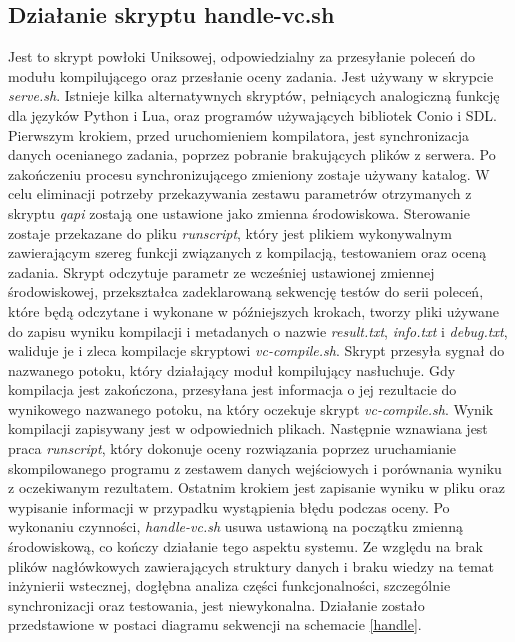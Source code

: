 \subsection{Działanie skryptu handle-vc.sh}
Jest to skrypt powłoki Uniksowej, odpowiedzialny za przesyłanie poleceń do modułu kompilującego oraz przesłanie oceny zadania. Jest używany w skrypcie \textit{serve.sh}. Istnieje kilka alternatywnych skryptów, pełniących analogiczną funkcję dla języków Python i Lua, oraz programów używających bibliotek Conio i SDL. Pierwszym krokiem, przed uruchomieniem kompilatora, jest synchronizacja danych ocenianego zadania, poprzez pobranie brakujących plików z serwera. Po zakończeniu procesu synchronizującego zmieniony zostaje używany katalog. W celu eliminacji potrzeby przekazywania zestawu parametrów otrzymanych z skryptu \textit{qapi} zostają one ustawione jako zmienna środowiskowa. Sterowanie zostaje przekazane do pliku \textit{runscript}, który jest plikiem wykonywalnym zawierającym szereg funkcji związanych z kompilacją, testowaniem oraz oceną zadania. Skrypt odczytuje parametr ze wcześniej ustawionej zmiennej środowiskowej, przekształca zadeklarowaną sekwencję testów do serii poleceń, które będą odczytane i wykonane w późniejszych krokach, tworzy pliki używane do zapisu wyniku kompilacji i metadanych o nazwie \textit{result.txt}, \textit{info.txt} i \textit{debug.txt}, waliduje je i zleca kompilacje skryptowi \textit{vc-compile.sh}. Skrypt przesyła sygnał do nazwanego potoku, który działający moduł kompilujący nasłuchuje. Gdy kompilacja jest zakończona, przesyłana jest informacja o jej rezultacie do wynikowego nazwanego potoku, na który oczekuje skrypt \textit{vc-compile.sh}. Wynik kompilacji zapisywany jest w odpowiednich plikach. Następnie wznawiana jest praca \textit{runscript}, który dokonuje oceny rozwiązania poprzez uruchamianie skompilowanego programu z zestawem danych wejściowych i porównania wyniku z oczekiwanym rezultatem. Ostatnim krokiem jest zapisanie wyniku w pliku oraz wypisanie informacji w przypadku wystąpienia błędu podczas oceny. Po wykonaniu czynności, \textit{handle-vc.sh} usuwa ustawioną na początku zmienną środowiskową, co kończy działanie tego aspektu systemu. Ze względu na brak plików nagłówkowych zawierających struktury danych i braku wiedzy na temat inżynierii wstecznej, dogłębna analiza części funkcjonalności, szczególnie synchronizacji oraz testowania, jest niewykonalna. Działanie zostało przedstawione w postaci diagramu sekwencji na schemacie \ref{handle}.
